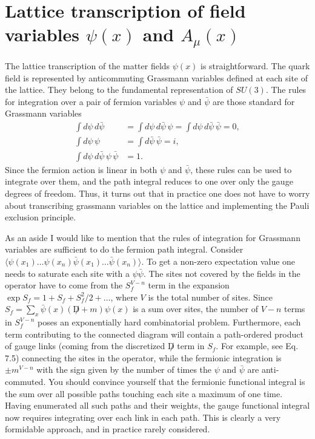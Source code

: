 \section{Lattice transcription of field variables \(\psi(x)\) and \(A_\mu(x)\)}

The lattice transcription of the matter fields \(\psi(x)\) is straightforward. The quark field is represented by anticommuting Grassmann variables defined at each site of the lattice. They belong to the fundamental representation of \(SU(3)\). The rules for integration over a pair of fermion variables \(\psi\) and \(\bar{\psi}\) are those standard for Grassmann variables
\begin{equation}
\begin{aligned}
\int d\psi\,d\bar{\psi} &= \int d\psi\,d\bar{\psi}\,\psi = \int d\psi\,d\bar{\psi}\,\bar{\psi} = 0 , \\
\int d\psi\,\psi &= \int d\bar{\psi}\,\bar{\psi} = i , \\
\int d\psi\,d\bar{\psi}\,\psi\,\bar{\psi} &= 1 .
\end{aligned}
\end{equation}
Since the fermion action is linear in both \(\psi\) and \(\bar{\psi}\), these rules can be used to integrate over them, and the path integral reduces to one over only the gauge degrees of freedom. Thus, it turns out that in practice one does not have to worry about transcribing grassmann variables on the lattice and implementing the Pauli exclusion principle.

As an aside I would like to mention that the rules of integration for Grassmann variables are sufficient to do the fermion path integral. Consider \(\langle \psi(x_1) \ldots \psi(x_n)\bar{\psi}(x_1) \ldots \bar{\psi}(x_n) \rangle\). To get a non-zero expectation value one needs to saturate each site with a \(\psi\bar{\psi}\). The sites not covered by the fields in the operator have to come from the \(S_f^{V-n}\) term in the expansion \(\exp S_f = 1 + S_f + S_f^2/2 + \ldots\), where \(V\) is the total number of sites. Since \(S_f = \sum_x \bar{\psi}(x)(\not D + m)\psi(x)\) is a sum over sites, the number of \(V-n\) terms in \(S_f^{V-n}\) poses an exponentially hard combinatorial problem. Furthermore, each term contributing to the connected diagram will contain a path-ordered product of gauge links (coming from the discretized \(\not D\) term in \(S_f\). For example, see Eq. 7.5) connecting the sites in the operator, while the fermionic integration is \(\pm m^{V-n}\) with the sign given by the number of times the \(\psi\) and \(\bar{\psi}\) are anti-commuted. You should convince yourself that the fermionic functional integral is the sum over all possible paths touching each site a maximum of one time. Having enumerated all such paths and their weights, the gauge functional integral now requires integrating over each link in each path. This is clearly a very formidable approach, and in practice rarely considered.

